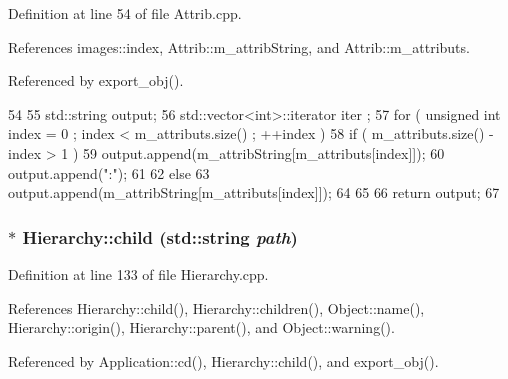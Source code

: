 Definition at line 54 of file Attrib.cpp.

References images::index, Attrib::m\_\-attribString, and Attrib::m\_\-attributs.

Referenced by export\_\-obj().


\begin{DoxyCode}
54                             {
55   std::string output;
56   std::vector<int>::iterator iter ;
57   for ( unsigned int index = 0 ; index < m_attributs.size() ; ++index ) {
58     if ( m_attributs.size() - index > 1 ) {
59       output.append(m_attribString[m_attributs[index]]);
60       output.append(":");
61     }
62     else {
63       output.append(m_attribString[m_attributs[index]]);
64     }
65   }
66   return output;
67 }
\end{DoxyCode}
\hypertarget{classHierarchy_a1e207f973c694b538bf90107b4868817}{
\subsubsection[{child}]{ $\ast$ Hierarchy::child (std::string {\em path})}}
\label{classHierarchy_a1e207f973c694b538bf90107b4868817}


Definition at line 133 of file Hierarchy.cpp.

References Hierarchy::child(), Hierarchy::children(), Object::name(), Hierarchy::origin(), Hierarchy::parent(), and Object::warning().

Referenced by Application::cd(), Hierarchy::child(), and export\_\-obj().


